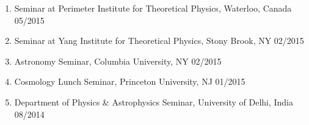 \begin{enumerate}
  \item Seminar at Perimeter Institute for Theoretical Physics, Waterloo, Canada 05/2015
  \item Seminar at Yang Institute for Theoretical Physics, Stony Brook, NY 02/2015
  \item Astronomy Seminar, Columbia University, NY 02/2015
  \item Cosmology Lunch Seminar, Princeton University, NJ 01/2015
  \item Department of Physics \& Astrophysics Seminar, University of Delhi, India 08/2014
\end{enumerate}



